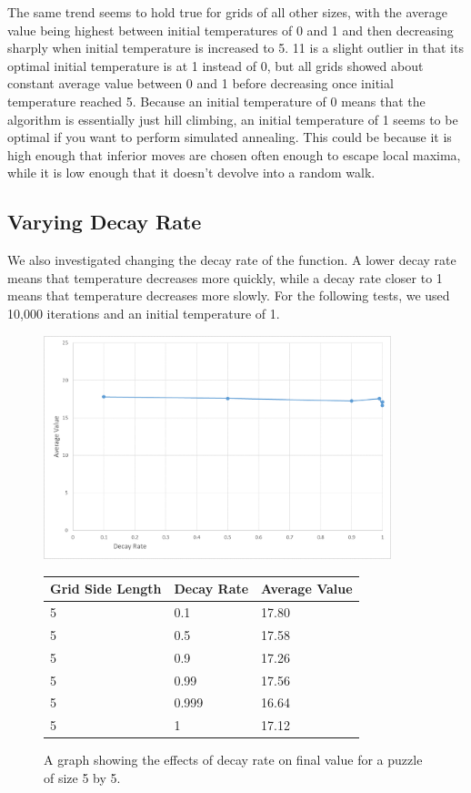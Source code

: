 \documentclass[12pt]{article}
\begin{document}
The same trend seems to hold true for grids of all other sizes, with the average value being highest between initial temperatures of 0 and 1 and then decreasing sharply when initial temperature is increased to 5. 11 is a slight outlier in that its optimal initial temperature is at 1 instead of 0, but all grids showed about constant average value between 0 and 1 before decreasing once initial temperature reached 5. Because an initial temperature of 0 means that the algorithm is essentially just hill climbing, an initial temperature of 1 seems to be optimal if you want to perform simulated annealing. This could be because it is high enough that inferior moves are chosen often enough to escape local maxima, while it is low enough that it doesn't devolve into a random walk.

\subsection*{Varying Decay Rate}

We also investigated changing the decay rate of the function. A lower decay rate means that temperature decreases more quickly, while a decay rate closer to 1 means that temperature decreases more slowly. For the following tests, we used 10,000 iterations and an initial temperature of 1.

\begin{figure}[H]
    \centering
    \includegraphics[width=0.9\textwidth]{simulated_annealing_5x5_decay_excel}
\begin{tabular}{ |p{4cm}||p{4cm}|p{4cm}|  }
 \hline
Grid Side Length& Decay Rate &Average Value\\
 \hline
5&0.1&17.80\\
5&0.5&17.58\\
5&0.9&17.26\\
5&0.99&17.56\\
5&0.999&16.64\\
5&1&17.12\\
 \hline
\end{tabular}
    \caption{A graph showing the effects of decay rate on final value for a puzzle of size 5 by 5.}
    \label{fig:simulated_annealing_5x5_decay}
\end{figure}
\end{document}
